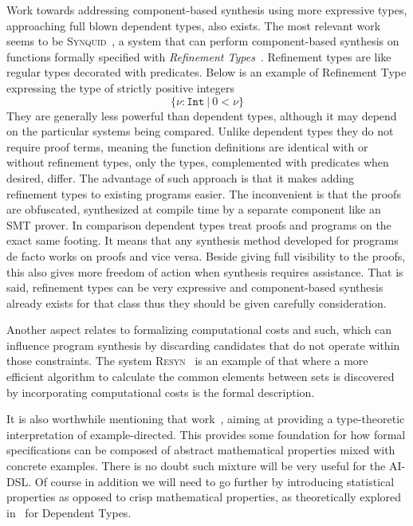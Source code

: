 \documentclass[]{report}
\begin{document}
Work towards addressing component-based synthesis using more
expressive types, approaching full blown dependent types, also exists.
The most relevant work seems to be
\textsc{Synquid}~\cite{Polikarpova2016}, a system that can perform
component-based synthesis on functions formally specified with
\emph{Refinement Types}~\cite{Flanagan2006}.  Refinement types are
like regular types decorated with predicates.  Below is an example of
Refinement Type expressing the type of strictly positive integers
$$\{\nu : \texttt{Int}\ |\ 0 < \nu\}$$
They are generally less powerful than dependent types, although it may
depend on the particular systems being compared.  Unlike dependent
types they do not require proof terms, meaning the function
definitions are identical with or without refinement types, only the
types, complemented with predicates when desired, differ.  The
advantage of such approach is that it makes adding refinement types to
existing programs easier.  The inconvenient is that the proofs are
obfuscated, synthesized at compile time by a separate component like
an SMT prover.  In comparison dependent types treat proofs and
programs on the exact same footing.  It means that any synthesis
method developed for programs de facto works on proofs and vice versa.
Beside giving full visibility to the proofs, this also gives more
freedom of action when synthesis requires assistance.  That is said,
refinement types can be very expressive and component-based synthesis
already exists for that class thus they should be given carefully
consideration.

Another aspect relates to formalizing computational costs and such,
which can influence program synthesis by discarding candidates that do
not operate within those constraints.  The system
\textsc{Resyn}~\cite{Knoth2019} is an example of that where a more
efficient algorithm to calculate the common elements between sets is
discovered by incorporating computational costs is the formal
description.

It is also worthwhile mentioning that work~\cite{Frankle2016}, aiming
at providing a type-theoretic interpretation of example-directed.
This provides some foundation for how formal specifications can be
composed of abstract mathematical properties mixed with concrete
examples.  There is no doubt such mixture will be very useful for the
AI-DSL.  Of course in addition we will need to go further by
introducing statistical properties as opposed to crisp mathematical
properties, as theoretically explored in~\cite{Warrell2016} for
Dependent Types.
\end{document}
